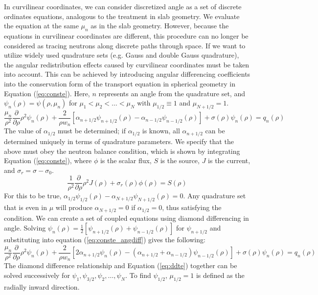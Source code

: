 \documentclass[11pt, oneside]{article}   	%
\begin{document}
In curvilinear coordinates, we can consider discretized angle as a set of discrete ordinates equations, analogous to the treatment in slab geometry. We evaluate the equation at the same $\mu_n$ as in the slab geometry. However, because the equations in curvilinear coordinates are different, this procedure can no longer be considered as tracing neutrons along discrete paths through space. If we want to utilize widely used quadrature sets (e.g. Gauss and double Gauss quadrature), the angular redistribution effects caused by curvilinear coordinates must be taken into account. This can be achieved by introducing angular differencing coefficients into the conservation form of the transport equation in spherical geometry in Equation (\ref{eq:conste}). Here, $n$ represents an angle from the quadrature set, and $\psi_n(\rho) = \psi(\rho, \mu_n)$ for $\mu_1 < \mu_2 < \dots < \mu_N$ with $\mu_{1/2} \equiv 1$ and $\mu_{N+1/2} = 1$.
\newline
\begin{equation}\label{eq:conste_angdiff}
\frac{\mu_n}{\rho^2}\frac{\partial}{\partial\rho}\rho^2\psi_n(\rho)+
\frac{2}{\rho w_n}\left[\alpha_{n+1/2}\psi_{n+1/2}(\rho)-\alpha_{n-1/2}\psi_{n-1/2}(\rho)\right]+
\sigma(\rho)\psi_n(\rho) = 
q_n(\rho)
\end{equation}
\newline
The value of $\alpha_{1/2}$ must be determined; if $\alpha_{1/2}$ is known, all  $\alpha_{n+1/2}$ can be determined uniquely in terms of quadrature parameters. We specify that the above must obey the neutron balance condition, which is shown by integrating Equation (\ref{eq:conste}), where $\phi$ is the scalar flux, $S$ is the source, $J$ is the current, and $\sigma_r = \sigma - \sigma_0$.
\newline
\begin{equation}\label{eq:nbal}
\frac{1}{\rho^2}\frac{\partial}{\partial\rho}\rho^2J(\rho)+
\sigma_r(\rho)\phi(\rho)=
S(\rho)
\end{equation}
\newline
For this to be true, $\alpha_{1/2}\psi_{1/2}(\rho)-\alpha_{N+1/2}\psi_{N+1/2}(\rho)=0$. Any quadrature set that is even in $\mu$ will produce $\alpha_{N+1/2}=0$ if $\alpha_{1/2}=0$, thus satisfying the condition. We can create a set of coupled equations using diamond differencing in angle. Solving $\psi_n(\rho)=\frac{1}{2}\left[\psi_{n+1/2}(\rho)+\psi_{n-1/2}(\rho)\right]$ for $\psi_{n+1/2}$ and substituting into equation (\ref{eq:conste_angdiff}) gives the following:
\newline
\begin{equation}\label{eq:ddte}
\frac{\mu_n}{\rho^2}\frac{\partial}{\partial\rho}\rho^2\psi_n(\rho)+
\frac{2}{\rho w_n}\left[2\alpha_{n+1/2}\psi_{n}(\rho)-(\alpha_{n+1/2}+\alpha_{n-1/2})\psi_{n-1/2}(\rho)\right]+
\sigma(\rho)\psi_n(\rho) = 
q_n(\rho)
\end{equation}
\newline
The diamond difference relationship and Equation (\ref{eq:ddte}) together can be solved successively for $\psi_1, \psi_{3/2}, \psi_2, \dots, \psi_N$. To find $\psi_{1/2}$, $\mu_{1/2}=1$ is defined as the radially inward direction.
\end{document}

